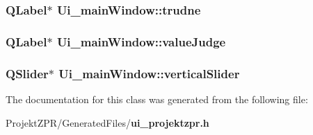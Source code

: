 \subsubsection[{trudne}]{\setlength{\rightskip}{0pt plus 5cm}Q\-Label$\ast$ Ui\-\_\-main\-Window\-::trudne}\label{class_ui__main_window_ad4fa099b7852f9a0f7778e61ddf0077f}
\subsubsection[{value\-Judge}]{\setlength{\rightskip}{0pt plus 5cm}Q\-Label$\ast$ Ui\-\_\-main\-Window\-::value\-Judge}\label{class_ui__main_window_a7d99246c2abf4185f0b2256f5ef0474d}
\subsubsection[{vertical\-Slider}]{\setlength{\rightskip}{0pt plus 5cm}Q\-Slider$\ast$ Ui\-\_\-main\-Window\-::vertical\-Slider}\label{class_ui__main_window_a1d755944d8ca6e6d86a9a92ac05bbb77}


The documentation for this class was generated from the following file\-:\begin{DoxyCompactItemize}
\item 
Projekt\-Z\-P\-R/\-Generated\-Files/{\bf ui\-\_\-projektzpr.\-h}\end{DoxyCompactItemize}
